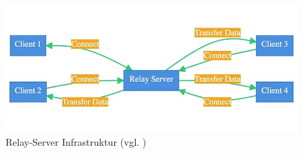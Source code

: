\begin{figure}[ht]
\centering
\includegraphics[width=1\linewidth]{content/pictures/0_o7LJU1ImxPHIM5Ej.png}
\caption{Relay-Server Infrastruktur (vgl. \cite{mygames_unity_2024})}
\label{fig:relay-server}
\end{figure}


